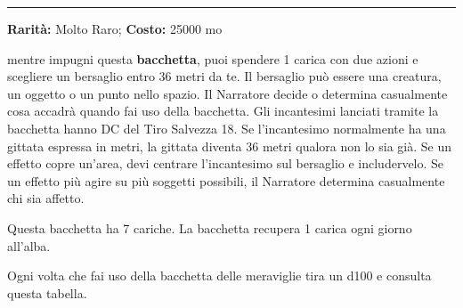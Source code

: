 \begin{multicols}{2}
\smallskip\noindent\rule{\linewidth}{2pt}  \hypertarget{BacchettadelleMeraviglie}{}\medskip{}\noindent\label{BacchettadelleMeraviglie}

\textbf{Rarità:} Molto Raro; \textbf{Costo:} 25000 mo

mentre impugni questa \textbf{bacchetta}, puoi spendere 1 carica con due azioni e scegliere un bersaglio entro 36 metri da te. Il bersaglio può essere una creatura, un oggetto o un punto nello spazio. Il Narratore decide o determina casualmente cosa accadrà quando fai uso della bacchetta. Gli incantesimi lanciati tramite la bacchetta hanno DC del Tiro Salvezza 18. Se l'incantesimo normalmente ha una gittata espressa in metri, la gittata diventa 36 metri qualora non lo sia già. Se un effetto copre un'area, devi centrare l'incantesimo sul bersaglio e includervelo. Se un effetto più agire su più soggetti possibili, il Narratore determina casualmente chi sia affetto.

Questa bacchetta ha 7 cariche. La bacchetta recupera 1 carica ogni giorno all'alba.

Ogni volta che fai uso della bacchetta delle meraviglie tira un d100 e consulta questa tabella.


%

\medskip


\end{multicols}
